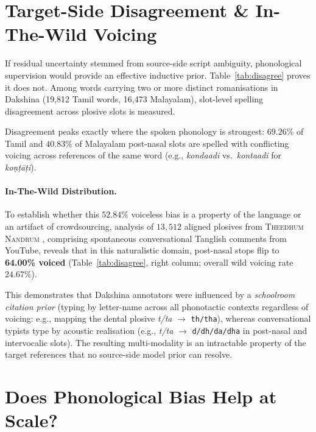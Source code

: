 \documentclass[11pt]{article}
\begin{document}
\section{Target-Side Disagreement \& In-The-Wild Voicing}
\label{sec:disagree}



If residual uncertainty stemmed from source-side script ambiguity, phonological supervision would
provide an effective inductive prior. Table~\ref{tab:disagree} proves it does not. Among words
carrying two or more distinct romanisations in Dakshina (19{,}812 Tamil words, 16{,}473 Malayalam),
slot-level spelling disagreement across plosive slots is measured.

Disagreement peaks exactly where the spoken phonology is strongest: $69.26\%$ of Tamil and
$40.83\%$ of Malayalam post-nasal slots are spelled with conflicting voicing across references of the
same word (e.g., \textit{kondaadi} vs.\ \textit{kontaadi} for \textit{ko\d{n}\d{t}\={a}\d{t}i}).

\paragraph{In-The-Wild Distribution.}
To establish whether this $52.84\%$ voiceless bias is a property of the language or an artifact of
crowdsourcing, analysis of $13{,}512$ aligned plosives from \textsc{Theedhum Nandrum}
\cite{lakshmanan2020theedhum}, comprising spontaneous conversational Tanglish comments from
YouTube, reveals that in this naturalistic domain, post-nasal stops flip to \textbf{64.00\% voiced}
(Table~\ref{tab:disagree}, right column; overall wild voicing rate $24.67\%$).

This demonstrates that Dakshina annotators were influenced by a \emph{schoolroom citation prior}
(typing by letter-name across all phonotactic contexts regardless of voicing: e.g., mapping the dental plosive \textit{t/ta} $\rightarrow$ \texttt{th/tha}), whereas conversational
typists type by acoustic realisation (e.g., \textit{t/ta} $\rightarrow$ \texttt{d/dh/da/dha} in post-nasal and intervocalic slots). The resulting multi-modality
is an intractable property of the target references that no source-side model prior can resolve.

\section{Does Phonological Bias Help at Scale?}
\label{sec:scale}
\end{document}
